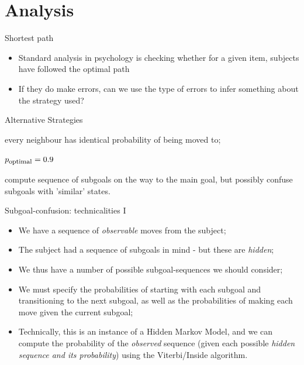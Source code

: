 \documentclass[xcolor=table]{beamer}
\newcommand{\sub}[1]{\mbox{\footnotesize #1}}
\begin{document}
\section{Analysis}
\label{sec:analysis}

\begin{frame}{Shortest path}
  \begin{itemize}
  \item Standard analysis in psychology is checking whether for a given item, subjects have followed the optimal path
  \item If they do make errors, can we use the type of errors to infer something about the strategy used?
  \end{itemize}
\end{frame}

\begin{frame}{Alternative Strategies}
  \begin{description}[<+->]
  \item[Random walk:] every neighbour has identical probability of being moved to;
  \item[Optimal path (with 'performance' noise):] $p_{\sub{optimal}}=0.9$
  \item[Subgoal-confusion:] compute sequence of subgoals on the way to the main goal, but possibly confuse subgoals with 'similar' states.
  \end{description}
\end{frame}

\begin{frame}{Subgoal-confusion: technicalities I}
  \begin{itemize}[<+->]
  \item We have a sequence of \emph{observable} moves from the subject;
  \item The subject had a sequence of subgoals in mind - but these are \emph{hidden};
  \item We thus have a number of possible subgoal-sequences we should consider;
  \item We must specify the probabilities of starting with each subgoal and transitioning to the next subgoal, as well as the probabilities of making each move given the current subgoal;
  \item Technically, this is an instance of a Hidden Markov Model, and we can compute the probability of the \emph{observed} sequence (given each possible \emph{hidden sequence and its probability}) using the Viterbi/Inside algorithm.
  \end{itemize}
\end{frame}
\end{document}
